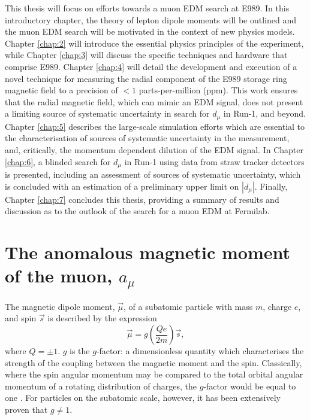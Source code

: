 This thesis will focus on efforts towards a muon EDM search at E989. In this introductory chapter, the theory of lepton dipole moments will be outlined and the muon EDM search will be motivated in the context of new physics models. Chapter \ref{chap:2} will introduce the essential physics principles of the experiment, while Chapter \ref{chap:3} will discuss the specific techniques and hardware that comprise E989. Chapter \ref{chap:4} will detail the development and execution of a novel technique for measuring the radial component of the E989 storage ring magnetic field to a precision of $<1$ parts-per-million (ppm). This work ensures that the radial magnetic field, which can mimic an EDM signal, does not present a limiting source of systematic uncertainty in search for $d_{\mu}$ in Run-1, and beyond. Chapter \ref{chap:5} describes the large-scale simulation efforts which are essential to the characterisation of sources of systematic uncertainty in the measurement, and, critically, the momentum dependent dilution of the EDM signal. In Chapter \ref{chap:6}, a blinded search for $d_{\mu}$ in Run-1 using data from straw tracker detectors is presented, including an assessment of sources of systematic uncertainty, which is concluded with an estimation of a preliminary upper limit on $|d_{\mu}|$. Finally, Chapter \ref{chap:7} concludes this thesis, providing a summary of results and discussion as to the outlook of the search for a muon EDM at Fermilab. 

\section{The anomalous magnetic moment of the muon, $a_{\mu}$} \label{sec:TheMDM}
%
The magnetic dipole moment, $\vec{\mu}$, of a subatomic particle with mass $m$, charge $e$, and spin $\vec{s}$ is described by the expression %
%
\begin{equation} 
  \vec{\mu} = g\left(\frac{Qe}{2m}\right)\vec{s},
  \label{eqn:MDM}
\end{equation}
%
where $Q=\pm1$. $g$ is the $g$-factor: a dimensionless quantity which characterises the strength of the coupling between the magnetic moment and the spin. Classically, where the spin angular momentum may be compared to the total orbital angular momentum of a rotating distribution of charges, the $g$-factor would be equal to one \cite{Jackson}. For particles on the subatomic scale, however, it has been extensively proven that $g\neq1$. %

